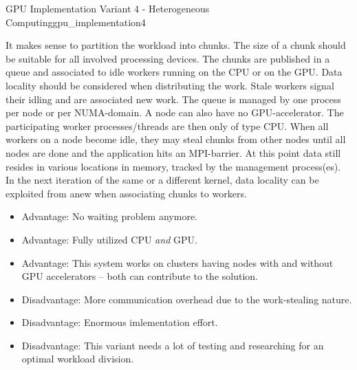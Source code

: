 \documentclass{article}
\theoremstyle{plain} %
\theoremstyle{convention} %
\theoremstyle{remark} %
\numberwithin{equation}{section}
\begin{document}
\begin{proposal}{GPU Implementation Variant 4 - Heterogeneous Computing}{gpu_implementation4} %

It makes sense to partition the workload into chunks. The size of a chunk should be suitable for all involved processing devices. The chunks are published in a queue and associated to idle workers running on the CPU or on the GPU. Data locality should be considered when distributing the work. Stale workers signal their idling and are associated new work. The queue is managed by one process per node or per NUMA-domain. A node can also have no GPU-accelerator. The participating worker processes/threads are then only of type CPU. When all workers on a node become idle, they may steal chunks from other nodes until all nodes are done and the application hits an MPI-barrier. At this point data still resides in various locations in memory, tracked by the management process(es). In the next iteration of the same or a different kernel, data locality can be exploited from anew when associating chunks to workers.

\begin{itemize}
    \item Advantage: No waiting problem anymore.
    \item Advantage: Fully utilized CPU \textit{and} GPU.
    \item Advantage: This system works on clusters having nodes with and without GPU accelerators -- both can contribute to the solution.
    \item Disadvantage: More communication overhead due to the work-stealing nature.
    \item Disadvantage: Enormous imlementation effort.
    \item Disadvantage: This variant needs a lot of testing and researching for an optimal workload division.
\end{itemize}


\end{proposal}
\end{document}
